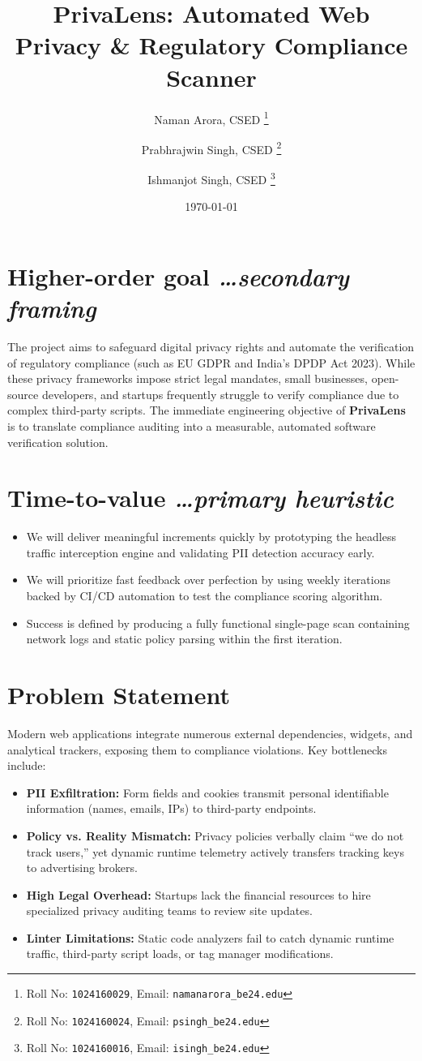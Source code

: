 \documentclass[11pt,a4paper]{article}
\title{PrivaLens: Automated Web Privacy \& Regulatory Compliance Scanner}
\author{
  Naman Arora, CSED%
  \thanks{Roll No: \texttt{1024160029}, %
    Email: \texttt{namanarora\_be24\@thapar.edu}}
  \and 
  Prabhrajwin Singh, CSED%
  \thanks{Roll No: \texttt{1024160024}, %
    Email: \texttt{psingh\_be24\@thapar.edu}}
  \and
  Ishmanjot Singh, CSED%
  \thanks{Roll No: \texttt{1024160016}, %
    Email: \texttt{isingh\_be24\@thapar.edu}}
}
\date{\today}
\newcommand{\BvrHint}[1]{{\normalfont\normalsize\itshape\hfill #1}}
\begin{document}
\maketitle

\section{Higher-order goal%
  \BvrHint{\ldots secondary framing}}
The project aims to safeguard digital privacy rights and automate the verification of regulatory compliance (such as EU GDPR and India's DPDP Act 2023). While these privacy frameworks impose strict legal mandates, small businesses, open-source developers, and startups frequently struggle to verify compliance due to complex third-party scripts. The immediate engineering objective of \textbf{PrivaLens} is to translate compliance auditing into a measurable, automated software verification solution.

\section{Time-to-value %
\BvrHint{\ldots primary heuristic}}
\begin{itemize}[leftmargin=0.7cm]
    \item We will deliver meaningful increments quickly by prototyping the headless traffic interception engine and validating PII detection accuracy early.
    \item We will prioritize fast feedback over perfection by using weekly iterations backed by CI/CD automation to test the compliance scoring algorithm.
    \item Success is defined by producing a fully functional single-page scan containing network logs and static policy parsing within the first iteration.
\end{itemize}

\section{Problem Statement}
Modern web applications integrate numerous external dependencies, widgets, and analytical trackers, exposing them to compliance violations. Key bottlenecks include:
\begin{itemize}[leftmargin=0.7cm]
    \item \textbf{PII Exfiltration:} Form fields and cookies transmit personal identifiable information (names, emails, IPs) to third-party endpoints.
    \item \textbf{Policy vs. Reality Mismatch:} Privacy policies verbally claim ``we do not track users,'' yet dynamic runtime telemetry actively transfers tracking keys to advertising brokers.
    \item \textbf{High Legal Overhead:} Startups lack the financial resources to hire specialized privacy auditing teams to review site updates.
    \item \textbf{Linter Limitations:} Static code analyzers fail to catch dynamic runtime traffic, third-party script loads, or tag manager modifications.
\end{itemize}
\end{document}
